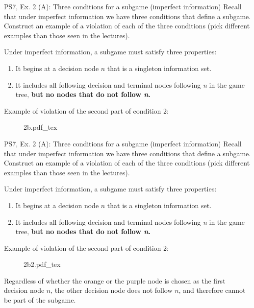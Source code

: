 \begin{frame}{PS7, Ex. 2 (A): Three conditions for a subgame (imperfect information)}
  Recall that under imperfect information we have three conditions that define a subgame. Construct an example of a violation of each of the three conditions (pick different examples than those seen in the lectures).
  \begin{multicols}{2}
    Under imperfect information, a subgame must satisfy three properties:
    \begin{enumerate}
      \item It begins at a decision node $n$ that is a singleton information set.
      \item It includes all following decision and terminal nodes following \textit{n} in the game tree, \textbf{but no nodes that do not follow \textit{n}.}
    \end{enumerate}
    \vfill\null\columnbreak
    Example of violation of the second part of condition 2:
    \vspace{-4pt}
    \begin{figure}[!h]
      \center
      \def\svgwidth{\columnwidth}
      {2b.pdf_tex}
    \end{figure}
    \vfill\null
  \end{multicols}
\end{frame}
\begin{frame}{PS7, Ex. 2 (A): Three conditions for a subgame (imperfect information)}
  Recall that under imperfect information we have three conditions that define a subgame. Construct an example of a violation of each of the three conditions (pick different examples than those seen in the lectures).
  \begin{multicols}{2}
    Under imperfect information, a subgame must satisfy three properties:
    \begin{enumerate}
      \item It begins at a decision node $n$ that is a singleton information set.
      \item It includes all following decision and terminal nodes following \textit{n} in the game tree, \textbf{but no nodes that do not follow \textit{n}.}
    \end{enumerate}
    \vfill\null\columnbreak
    Example of violation of the second part of condition 2:
    \vspace{-20pt}
    \begin{figure}[!h]
      \center
      \def\svgwidth{1.1\columnwidth}
      {2b2.pdf_tex}
    \end{figure}
    Regardless of whether the orange or the purple node is chosen as the first decision node $n$, the other decision node does not follow $n$, and therefore cannot be part of the subgame.
    \vfill\null
  \end{multicols}
\end{frame}


